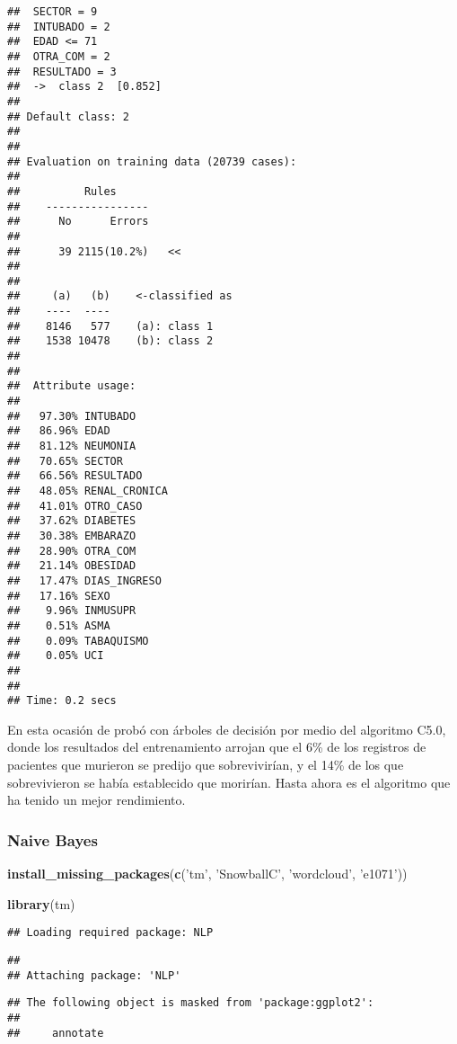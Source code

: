 \documentclass[]{article}
\newenvironment{Shaded}{\begin{snugshade}}{\end{snugshade}}
\newcommand{\KeywordTok}[1]{\textcolor[rgb]{0.13,0.29,0.53}{\textbf{#1}}}
\newcommand{\NormalTok}[1]{#1}
\newcommand{\StringTok}[1]{\textcolor[rgb]{0.31,0.60,0.02}{#1}}
\begin{document}
\begin{verbatim}
##  SECTOR = 9
##  INTUBADO = 2
##  EDAD <= 71
##  OTRA_COM = 2
##  RESULTADO = 3
##  ->  class 2  [0.852]
## 
## Default class: 2
## 
## 
## Evaluation on training data (20739 cases):
## 
##          Rules     
##    ----------------
##      No      Errors
## 
##      39 2115(10.2%)   <<
## 
## 
##     (a)   (b)    <-classified as
##    ----  ----
##    8146   577    (a): class 1
##    1538 10478    (b): class 2
## 
## 
##  Attribute usage:
## 
##   97.30% INTUBADO
##   86.96% EDAD
##   81.12% NEUMONIA
##   70.65% SECTOR
##   66.56% RESULTADO
##   48.05% RENAL_CRONICA
##   41.01% OTRO_CASO
##   37.62% DIABETES
##   30.38% EMBARAZO
##   28.90% OTRA_COM
##   21.14% OBESIDAD
##   17.47% DIAS_INGRESO
##   17.16% SEXO
##    9.96% INMUSUPR
##    0.51% ASMA
##    0.09% TABAQUISMO
##    0.05% UCI
## 
## 
## Time: 0.2 secs
\end{verbatim}

En esta ocasión de probó con árboles de decisión por medio del algoritmo
C5.0, donde los resultados del entrenamiento arrojan que el 6\% de los
registros de pacientes que murieron se predijo que sobrevivirían, y el
14\% de los que sobrevivieron se había establecido que morirían. Hasta
ahora es el algoritmo que ha tenido un mejor rendimiento.

\hypertarget{naive-bayes-1}{%
\subsubsection{Naive Bayes}\label{naive-bayes-1}}

\begin{Shaded}
\begin{Highlighting}[]
\KeywordTok{install_missing_packages}\NormalTok{(}\KeywordTok{c}\NormalTok{(}\StringTok{'tm'}\NormalTok{, }\StringTok{'SnowballC'}\NormalTok{, }\StringTok{'wordcloud'}\NormalTok{, }\StringTok{'e1071'}\NormalTok{))}

\KeywordTok{library}\NormalTok{(tm)}
\end{Highlighting}
\end{Shaded}

\begin{verbatim}
## Loading required package: NLP
\end{verbatim}

\begin{verbatim}
## 
## Attaching package: 'NLP'
\end{verbatim}

\begin{verbatim}
## The following object is masked from 'package:ggplot2':
## 
##     annotate
\end{verbatim}
\end{document}
